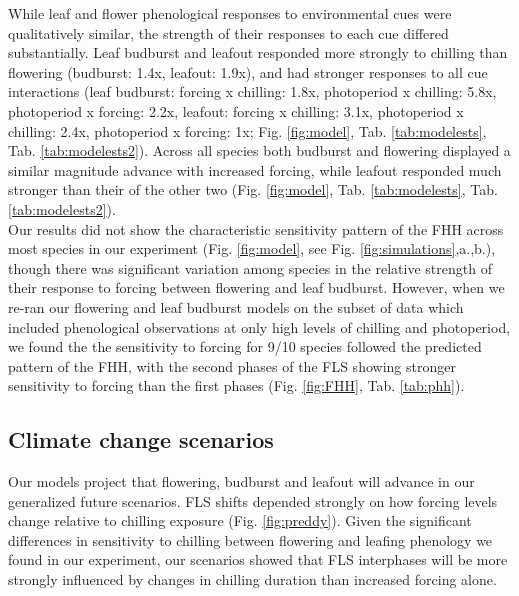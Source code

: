 \documentclass[12pt]{article}\usepackage[]{graphicx}\usepackage[]{color}
\begin{document}
\noindent While leaf and flower phenological responses to environmental cues were qualitatively similar, the strength of their responses to each cue differed substantially. Leaf budburst and leafout responded more strongly to chilling than flowering (budburst: 1.4x, leafout: 1.9x), and had stronger responses to all cue interactions (leaf budburst: forcing x chilling: 1.8x, photoperiod x chilling: 5.8x, photoperiod x forcing: 2.2x, leafout: forcing x chilling: 3.1x, photoperiod x chilling: 2.4x, photoperiod x forcing: 1x; Fig. \ref{fig:model}, Tab. \ref{tab:modelests}, Tab. \ref{tab:modelests2}). Across all species both budburst and flowering displayed a similar magnitude advance with increased forcing, while leafout responded much stronger than their of the other two (Fig. \ref{fig:model}, Tab. \ref{tab:modelests}, Tab. \ref{tab:modelests2}).\\

\noindent  Our results did not show the characteristic sensitivity pattern of the FHH across most species in our experiment (Fig. \ref{fig:model}, see Fig. \ref{fig:simulations},a.,b.), though there was significant variation among species in the relative strength of their response to forcing between flowering and leaf budburst. However, when we re-ran our flowering and leaf budburst models on the subset of data which included phenological observations at only high levels of chilling and photoperiod, we found the the sensitivity to forcing for 9/10 species followed the predicted pattern of the FHH, with the second phases of the FLS showing stronger sensitivity to forcing than the first phases (Fig. \ref{fig:FHH}, Tab. \ref{tab:phh}).\\ 


\subsection*{Climate change scenarios}
\noindent Our models project that flowering, budburst and leafout will advance in our generalized future scenarios. FLS shifts depended strongly on how forcing levels change relative to chilling exposure (Fig. \ref{fig:preddy}). Given the significant differences in sensitivity to chilling between flowering and leafing phenology we found in our experiment, our scenarios showed that FLS interphases will be more strongly influenced by changes in chilling duration than increased forcing alone.\\ 
\end{document}
